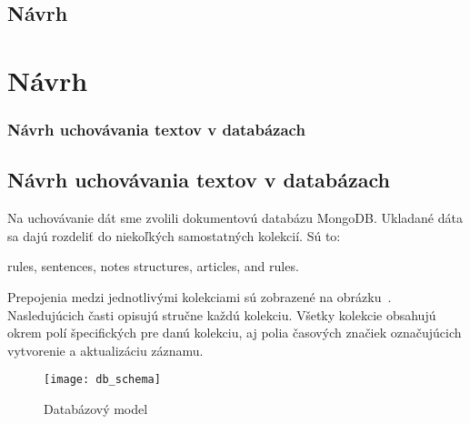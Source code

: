 \newpage
%
%
{
	\section{Návrh}
}
{
	\chapter{Návrh}
}
\label{section:design}

%
%
{
	\subsection{Návrh uchovávania textov v databázach}
}
{
	\section{Návrh uchovávania textov v databázach}
}
\label{subsection:our_design_persisting_data}
Na uchovávanie dát sme zvolili dokumentovú databázu MongoDB. Ukladané dáta sa dajú rozdeliť do niekoľkých samostatných kolekcií. Sú to:

\begin{my_itemize}
	\myitem rules,
	\myitem sentences,
	\myitem notes
	\myitem structures,
	\myitem articles,
	\myitem and rules.
\end{my_itemize}
	
Prepojenia medzi jednotlivými kolekciami sú zobrazené na obrázku~. Nasledujúcich časti opisujú stručne každú kolekciu. Všetky kolekcie obsahujú okrem polí špecifických pre danú kolekciu, aj polia časových značiek označujúcich vytvorenie a aktualizáciu záznamu.

\begin{figure}[H]
	\begin{center}\texttt{[image: db\_schema]}\end{center}
	\caption[Databázový model]{Databázový model}\label{fig:db_schema}
\end{figure}

